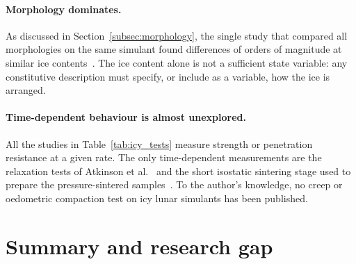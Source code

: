 \paragraph{Morphology dominates.} As discussed in Section~\ref{subsec:morphology}, the single study that compared all morphologies on the same simulant found differences of orders of magnitude at similar ice contents~\cite{ricardo2026}. The ice content alone is not a sufficient state variable: any constitutive description must specify, or include as a variable, how the ice is arranged.

\paragraph{Time-dependent behaviour is almost unexplored.} All the studies in Table~\ref{tab:icy_tests} measure strength or penetration resistance at a given rate. The only time-dependent measurements are the relaxation tests of Atkinson et al.~\cite{atkinson2020} and the short isostatic sintering stage used to prepare the pressure-sintered samples~\cite{johnson2024,ricardo2026}. To the author's knowledge, no creep or oedometric compaction test on icy lunar simulants has been published.

\section{Summary and research gap}
\label{sec:gap}

